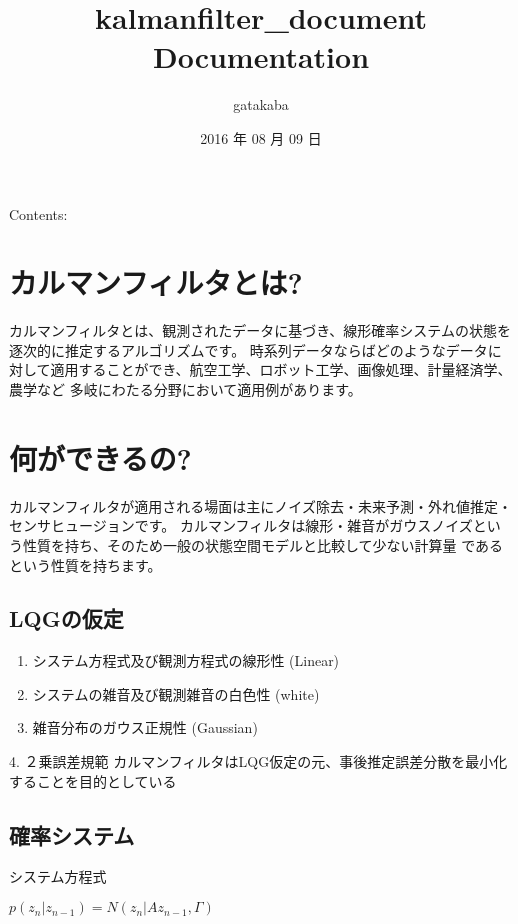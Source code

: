 \documentclass[letterpaper,10pt,dvipdfmx]{sphinxmanual}
\title{kalmanfilter\_document Documentation}
\date{2016 年 08 月 09 日}
\author{gatakaba}
\begin{document}
\maketitle
\tableofcontents
{}\label{index::doc}


Contents:


\chapter{カルマンフィルタとは?}
\label{docs/about_kalman::doc}\label{docs/about_kalman:id1}\label{docs/about_kalman:kalmanfilter}
カルマンフィルタとは、観測されたデータに基づき、線形確率システムの状態を逐次的に推定するアルゴリズムです。
時系列データならばどのようなデータに対して適用することができ、航空工学、ロボット工学、画像処理、計量経済学、農学など
多岐にわたる分野において適用例があります。


\chapter{何ができるの?}
\label{docs/about_kalman:id2}
カルマンフィルタが適用される場面は主にノイズ除去・未来予測・外れ値推定・センサヒュージョンです。
カルマンフィルタは線形・雑音がガウスノイズという性質を持ち、そのため一般の状態空間モデルと比較して少ない計算量
であるという性質を持ちます。


\section{LQGの仮定}
\label{docs/about_kalman:lqg}\begin{enumerate}
\item {} 
システム方程式及び観測方程式の線形性 (Linear)

\item {} 
システムの雑音及び観測雑音の白色性 (white)

\item {} 
雑音分布のガウス正規性 (Gaussian)

\end{enumerate}

4. ２乗誤差規範
カルマンフィルタはLQG仮定の元、事後推定誤差分散を最小化することを目的としている


\section{確率システム}
\label{docs/about_kalman:id3}
システム方程式

\(p(z_{n}|z_{n-1})=N(z_{n}|Az_{n-1},\Gamma)\)
\end{document}
